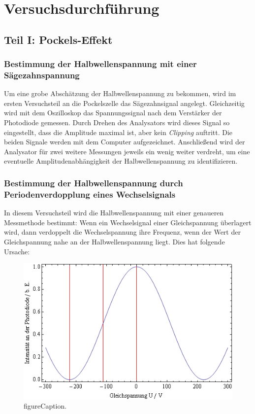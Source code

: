 \section{Versuchsdurchführung}
\subsection{Teil I: Pockels-Effekt}
\subsubsection{Bestimmung der Halbwellenspannung mit einer Sägezahnspannung}
Um eine grobe Abschätzung der Halbwellenspannung zu bekommen,
wird im ersten Versuchsteil an die Pockelszelle das Sägezahnsignal angelegt.
Gleichzeitig wird mit dem Oszilloskop das Spannungssignal nach dem Verstärker der Photodiode gemessen.
Durch Drehen des Analysators wird dieses Signal so eingestellt,
dass die Amplitude maximal ist, aber kein \emph{Clipping} auftritt.
Die beiden Signale werden mit dem Computer aufgezeichnet.
Anschließend wird der Analysator für zwei weitere Messungen jeweils ein wenig weiter verdreht,
um eine eventuelle Amplitudenabhängigkeit der Halbwellenspannung zu identifizieren. 


\subsubsection{Bestimmung der Halbwellenspannung durch Periodenverdopplung eines Wechselsignals}

In diesem Versuchsteil wird die Halbwellenspannung mit einer genaueren Messmethode bestimmt:
Wenn ein Wechselsignal einer Gleichspannung überlagert wird,
dann verdoppelt die Wechselspannung ihre Frequenz,
wenn der Wert der Gleichspannung nahe an der Halbwellenspannung liegt.
Dies hat folgende Ursache:

\begin{figure}[H]
\begin{center}
  \includegraphics[width=\textwidth]{../img/Pocktheo1.png}
  \caption{figureCaption.}
  \label{img:pocktheo1}
\end{center}
\end{figure}

